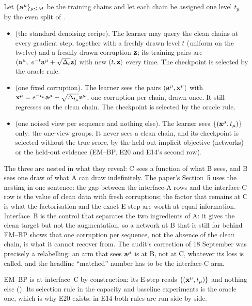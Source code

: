\begin{definition}
\label{def:interfaces}
Let $\{\mathbf{a}^\mu\}_{\mu\le M}$ be the training chains and let each chain be assigned one
level $t_\mu$ by the even split of .
\begin{itemize}
\item {} (the standard denoising recipe). The learner may query the clean
  chains at every gradient step, together with a freshly drawn level $t$ (uniform on the
  twelve) and a freshly drawn corruption $\mathbf{z}$; its training pairs are
  $(\mathbf{a}^\mu,\ e^{-t}\mathbf{a}^\mu+\sqrt{\Delta_t}\mathbf{z})$ with new $(t,\mathbf{z})$ every time. The checkpoint
  is selected by the oracle rule.
\item {} (one fixed corruption). The learner sees the pairs
  $(\mathbf{a}^\mu,\mathbf{x}^\mu)$ with $\mathbf{x}^\mu=e^{-t_\mu}\mathbf{a}^\mu+\sqrt{\Delta_{t_\mu}}\mathbf{z}^\mu$, one
  corruption per chain, drawn once. It still regresses on the clean chain. The
  checkpoint is selected by the oracle rule.
\item {} (one noised view per sequence and nothing else). The learner
  sees $\{(\mathbf{x}^\mu,t_\mu)\}$ only: the one-view groups. It never sees a clean chain, and
  its checkpoint is selected without the true score, by the held-out implicit
  objective (networks) or the held-out evidence (EM--BP, E20 and E14's second row).
\end{itemize}
\end{definition}

The three are nested in what they reveal: C sees a function of what B sees, and B sees
one draw of what A can draw indefinitely. The paper's Section~5 uses the nesting in one
sentence: the gap between the interface-A rows and the interface-C row is the value of
clean data with fresh corruptions; the factor that remains at C is what the
factorisation and the exact E-step are worth at equal information. Interface~B is the
control that separates the two ingredients of A: it gives the clean target but not the
augmentation, so a network at B that is still far behind EM--BP shows that one
corruption per sequence, not the absence of the clean chain, is what it cannot recover
from. The audit's correction of 18 September was precisely a relabelling: an arm that
sees $\mathbf{a}^\mu$ is at B, not at C, whatever its loss is called, and the headline
``matched'' number has to be the interface-C arm.

EM--BP is at interface~C by construction: its E-step reads $\{(\mathbf{x}^\mu,t_\mu)\}$ and
nothing else (). Its selection rule in the capacity and
baseline experiments is the oracle one, which is why E20 exists; in E14 both rules are
run side by side.

